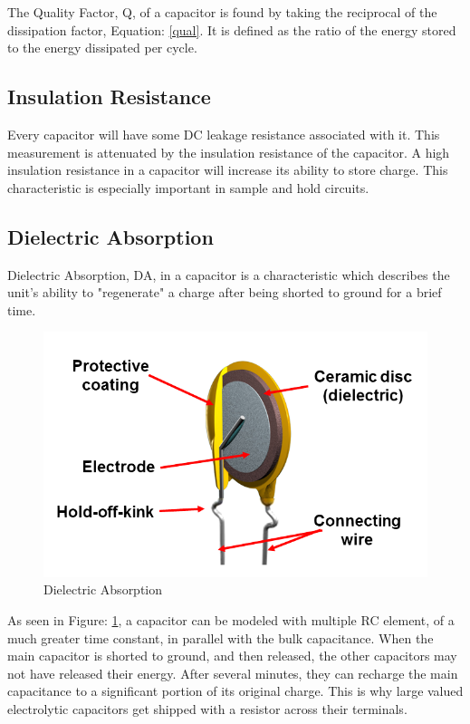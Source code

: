 The Quality Factor, Q, of a capacitor is found by taking the reciprocal of the dissipation factor, Equation: \eqref{qual}. It is defined as the ratio of the energy stored to the energy dissipated per cycle.

\subsection{Insulation Resistance}

Every capacitor will have some DC leakage resistance associated with it. This measurement is attenuated by the insulation resistance of the capacitor. A high insulation resistance in a capacitor will increase its ability to store charge. This characteristic is especially important in sample and hold circuits.

\subsection{Dielectric Absorption}

Dielectric Absorption, DA, in a capacitor is a characteristic which describes the unit's ability to "regenerate" a charge after being shorted to ground for a brief time.

\begin{figure}
    \includegraphics[keepaspectratio=true,scale=.5]{./figures/testImage.png}
    \centering
    \caption{Dielectric Absorption}
    \label{daPlot}
\end{figure}

As seen in Figure: \ref{daPlot}, a capacitor can be modeled with multiple RC element, of a much greater time constant, in parallel with the bulk capacitance. When the main capacitor is shorted to ground, and then released, the other capacitors may not have released their energy. After several minutes, they can recharge the main capacitance to a significant portion of its original charge. This is why large valued electrolytic capacitors get shipped with a resistor across their terminals.

